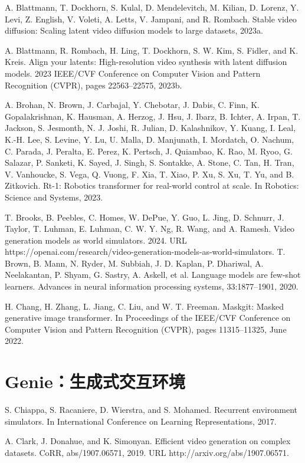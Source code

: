 \documentclass[10pt]{article}
\begin{document}
A. Blattmann, T. Dockhorn, S. Kulal, D. Mendelevitch, M. Kilian, D. Lorenz, Y. Levi, Z. English, V. Voleti, A. Letts, V. Jampani, and R. Rombach. Stable video diffusion: Scaling latent video diffusion models to large datasets, 2023a.

A. Blattmann, R. Rombach, H. Ling, T. Dockhorn, S. W. Kim, S. Fidler, and K. Kreis. Align your latents: High-resolution video synthesis with latent diffusion models. 2023 IEEE/CVF Conference on Computer Vision and Pattern Recognition (CVPR), pages 22563–22575, 2023b.

A. Brohan, N. Brown, J. Carbajal, Y. Chebotar, J. Dabis, C. Finn, K. Gopalakrishnan, K. Hausman, A. Herzog, J. Hsu, J. Ibarz, B. Ichter, A. Irpan, T. Jackson, S. Jesmonth, N. J. Joshi, R. Julian, D. Kalashnikov, Y. Kuang, I. Leal, K.-H. Lee, S. Levine, Y. Lu, U. Malla, D. Manjunath, I. Mordatch, O. Nachum, C. Parada, J. Peralta, E. Perez, K. Pertsch, J. Quiambao, K. Rao, M. Ryoo, G. Salazar, P. Sanketi, K. Sayed, J. Singh, S. Sontakke, A. Stone, C. Tan, H. Tran, V. Vanhoucke, S. Vega, Q. Vuong, F. Xia, T. Xiao, P. Xu, S. Xu, T. Yu, and B. Zitkovich. Rt-1: Robotics transformer for real-world control at scale. In Robotics: Science and Systems, 2023.

T. Brooks, B. Peebles, C. Homes, W. DePue, Y. Guo, L. Jing, D. Schnurr, J. Taylor, T. Luhman, E. Luhman, C. W. Y. Ng, R. Wang, and A. Ramesh. Video generation models as world simulators. 2024. URL https://openai.com/research/video-generation-models-as-world-simulators. T. Brown, B. Mann, N. Ryder, M. Subbiah, J. D. Kaplan, P. Dhariwal, A. Neelakantan, P. Shyam, G. Sastry, A. Askell, et al. Language models are few-shot learners. Advances in neural information processing systems, 33:1877–1901, 2020.

H. Chang, H. Zhang, L. Jiang, C. Liu, and W. T. Freeman. Maskgit: Masked generative image transformer. In Proceedings of the IEEE/CVF Conference on Computer Vision and Pattern Recognition (CVPR), pages 11315–11325, June 2022.

\section*{Genie：生成式交互环境}
S. Chiappa, S. Racaniere, D. Wierstra, and S. Mohamed. Recurrent environment simulators. In International Conference on Learning Representations, 2017.

A. Clark, J. Donahue, and K. Simonyan. Efficient video generation on complex datasets. CoRR, abs/1907.06571, 2019. URL http://arxiv.org/abs/1907.06571.
\end{document}
